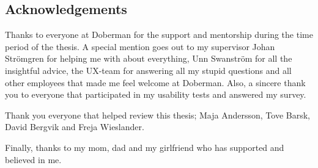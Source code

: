 \begin{center}
\section*{Acknowledgements}

Thanks to everyone at Doberman for the support and mentorship during the time period of the thesis. A special mention goes out to my supervisor Johan Str\"{o}mgren for helping me with about everything, Unn Swanstr\"{o}m for all the insightful advice, the UX-team for answering all my stupid questions and all other employees that made me feel welcome at Doberman. Also, a sincere thank you to everyone that participated in my usability tests and answered my survey.

Thank you everyone that helped review this thesis; Maja Andersson, Tove Barsk, David Bergvik and Freja Wieslander.

Finally, thanks to my mom, dad and my girlfriend who has supported and believed in me.
\end{center}
